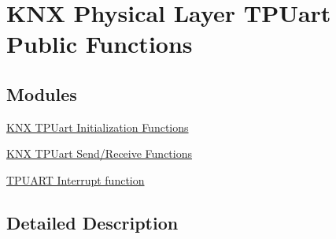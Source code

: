 \hypertarget{group___k_n_x___p_h___t_p_uart___exported___functions}{}\section{K\+NX Physical Layer T\+P\+Uart Public Functions}
\label{group___k_n_x___p_h___t_p_uart___exported___functions}
\subsection*{Modules}
\begin{DoxyCompactItemize}
\item 
\hyperlink{group___k_n_x___p_h___t_p_uart___exported___functions___group1}{K\+N\+X T\+P\+Uart Initialization Functions}
\item 
\hyperlink{group___k_n_x___p_h___t_p_uart___exported___functions___group2}{K\+N\+X T\+P\+Uart Send/\+Receive Functions}
\item 
\hyperlink{group___k_n_x___p_h___t_p_uart___exported___functions___group3}{T\+P\+U\+A\+R\+T Interrupt function}
\end{DoxyCompactItemize}


\subsection{Detailed Description}
